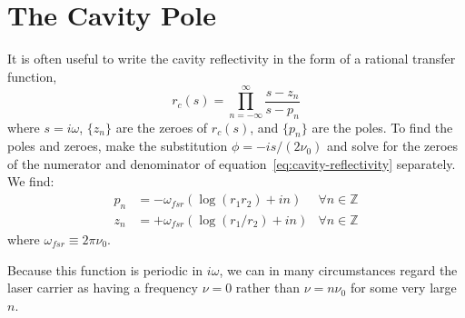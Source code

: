 \section{The Cavity Pole}
It is often useful to write the cavity reflectivity in the form of a
rational transfer function,
\begin{equation}
r_c(s) = \prod_{n=-\infty}^{\infty} \frac {s-z_n} {s-p_n}
\label{eq:rational-function}
\end{equation}
where $s=i\omega$, $\{z_n\}$ are the zeroes of $r_c(s)$, and $\{p_n\}$
are the poles.  To find the poles and zeroes, make the substitution
$\phi=-is/(2\nu_0)$ and solve for the zeroes of the numerator and
denominator of equation~\ref{eq:cavity-reflectivity} separately.  We find:
\begin{align}
p_n &= - \omega_{fsr} \left(\log\left(r_1 r_2\right) +  i n\right)  & \forall n\in \mathbb{Z}\\
z_n &= + \omega_{fsr} \left(\log\left(r_1/r_2\right) +  i n\right)  & \forall n\in \mathbb{Z}
\end{align}
where $\omega_{fsr}\equiv2\pi\nu_0$.

Because this function is periodic in $i\omega$, we can in many
circumstances regard the laser carrier as having a frequency
$\nu=0$ rather than $\nu = n\nu_0$ for some very large $n$.

